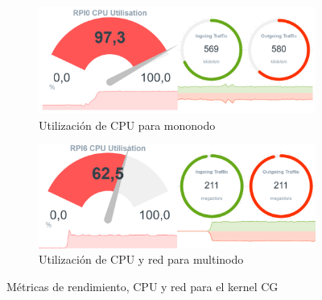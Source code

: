 \begin{figure}[htpb]
\begin{subfigure}[b]{0.495\textwidth}
\begin{adjustbox}{width=\linewidth,height=0.8\linewidth}
        \end{adjustbox}
        \label{fig:mops_process__cg}
    \end{subfigure}

    \begin{subfigure}[c]{0.75\textwidth}
        \includegraphics[width=\textwidth]{img/benchmark_rev/cg_rev_sn.png}
        \caption{Utilización de CPU para mononodo}
        \label{fig:mops_rev_sn__cg}
    \end{subfigure}

    \vspace{0.5cm}
    
    \begin{subfigure}[c]{0.75\textwidth}
        \includegraphics[width=\textwidth]{img/benchmark_rev/cg_rev_mn.png}
        \caption{Utilización de CPU y red para multinodo}
        \label{fig:mops_rev_mn__cg}
    \end{subfigure}
    \caption{Métricas de rendimiento, CPU y red para el kernel CG}
    \label{fig:mops__cg}
\end{figure}

